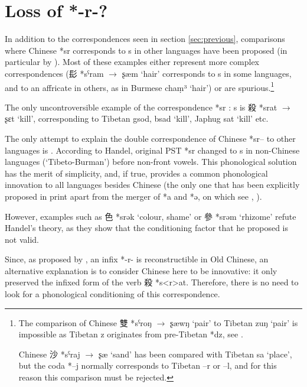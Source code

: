 \documentclass[oldfontcommands,oneside,a4paper,11pt]{article}
\newcommand{\ipa}[1]{{\phon #1}} %
\newcommand{\zh}[1]{{\cn #1}}
\begin{document}
\section{Loss of *-r-?}
In addition to the correspondences seen in section \ref{sec:previous}, comparisons where Chinese *\ipa{sr} corresponds to \ipa{s} in other languages have been proposed (in particular by \citealt{coblin86handlist}). Most of these examples either represent more complex correspondences (\zh{髟} *\ipa{sˁram} $\rightarrow$ \ipa{ʂæm} `hair' corresponds to \ipa{s} in some languages, and to an affricate in others, as in Burmese \ipa{chaṃ³} `hair') or are spurious.\footnote{The comparison of Chinese \zh{雙} *\ipa{sˁroŋ} $\rightarrow$ \ipa{ʂæwŋ} `pair' to Tibetan \ipa{zuŋ} `pair' is impossible as Tibetan \ipa{z} originates from pre-Tibetan *\ipa{dz}, see \citet{hill14dz}.

Chinese \zh{沙} *\ipa{sˁraj} $\rightarrow$ \ipa{ʂæ} `sand' has been compared with Tibetan \ipa{sa} `place', but the coda *\ipa{--j} normally corresponds to Tibetan \ipa{--r} or \ipa{--l}, and for this reason this comparison must be rejected. }

The only uncontroversible example of the correspondence *\ipa{sr} : \ipa{s} is  \zh{殺} *\ipa{srat} $\rightarrow$ \ipa{ʂɛt} `kill', corresponding to Tibetan \ipa{gsod, bsad} `kill', Japhug \ipa{sat} `kill' etc.



The only attempt to explain the double correspondence of Chinese *\ipa{sr--} to other languages is \citet[25]{handel02r}. According to Handel, original PST *\ipa{sr} changed to s in non-Chinese languages (`Tibeto-Burman') before non-front vowels. This phonological solution has the merit of simplicity, and, if true, provides a common phonological innovation to all languages besides Chinese (the only one that has been explicitly proposed in print apart from the merger of *\ipa{a} and *\ipa{ə}, on which see \citealt{gong95st}, \citealt{handel08st}).

However, examples such as \zh{色} *\ipa{srək} `colour, shame' or \zh{參} *\ipa{srəm} `rhizome' refute Handel's theory, as they show that the conditioning factor that he proposed is not valid.

Since, as proposed by \citet{sagart99roc}, an infix *\ipa{-r-} is reconstructible in Old Chinese, an alternative explanation is to consider Chinese here to be innovative: it only preserved the infixed form of the verb \zh{殺} *\ipa{s<r>at}. Therefore, there is no need to look for a phonological conditioning of this correspondence.
\end{document}
